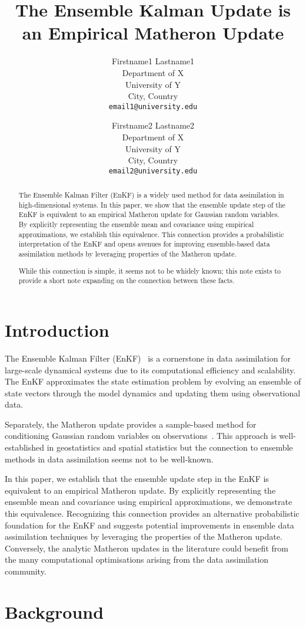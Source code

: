 \documentclass{article}
\title{The Ensemble Kalman Update is an Empirical Matheron Update}
\author{
  Firstname1 Lastname1 \\
  Department of X \\
  University of Y \\
  City, Country \\
  \texttt{email1@university.edu} \\
  \and
  Firstname2 Lastname2 \\
  Department of X \\
  University of Y \\
  City, Country \\
  \texttt{email2@university.edu} \\
}
\date{}
\begin{document}
\begin{abstract}
The Ensemble Kalman Filter (EnKF) is a widely used method for data assimilation in high-dimensional systems. In this paper, we show that the ensemble update step of the EnKF is equivalent to an empirical Matheron update for Gaussian random variables. By explicitly representing the ensemble mean and covariance using empirical approximations, we establish this equivalence. This connection provides a probabilistic interpretation of the EnKF and opens avenues for improving ensemble-based data assimilation methods by leveraging properties of the Matheron update.

While this connection is simple, it seems not to be whidely known; this note exists to provide a short note expanding on the connection between these facts.
\end{abstract}

\section{Introduction}
The Ensemble Kalman Filter (EnKF)~\citep{Evensen2003Ensemble,Evensen2009Data} is a cornerstone in data assimilation for large-scale dynamical systems due to its computational efficiency and scalability.
The EnKF approximates the state estimation problem by evolving an ensemble of state vectors through the model dynamics and updating them using observational data.

Separately, the Matheron update provides a sample-based method for conditioning Gaussian random variables on observations~\citep{Doucet2010Note,Wilson2020Efficiently,Wilson2021Pathwise}.
This approach is well-established in geostatistics and spatial statistics but the connection to ensemble methods in data assimilation seems not to be well-known.

In this paper, we establish that the ensemble update step in the EnKF is equivalent to an empirical Matheron update.
By explicitly representing the ensemble mean and covariance using empirical approximations, we demonstrate this equivalence.
Recognizing this connection provides an alternative  probabilistic foundation for the EnKF and suggests potential improvements in ensemble data assimilation techniques by leveraging the properties of the Matheron update.
Conversely, the analytic Matheron updates in the literature could benefit from the many computational optimisations arising from the data assimilation community.

\section{Background}
\end{document}
